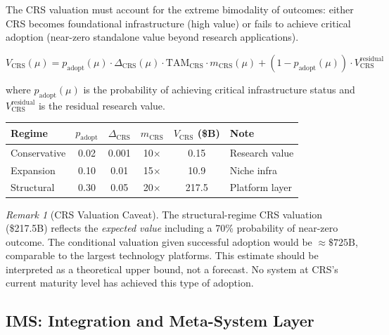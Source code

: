 \documentclass[11pt,a4paper]{article}
\theoremstyle{remark}
\newtheorem{remark}[definition]{Remark}
\newcommand{\VCRS}{V_{\mathrm{CRS}}}
\newcommand{\TAM}{\mathrm{TAM}}
\newcommand{\speculative}[1]{\textcolor{red!70!black}{#1}}
\begin{document}
The CRS valuation must account for the extreme bimodality of outcomes:
either CRS becomes foundational infrastructure (high value) or fails
to achieve critical adoption (near-zero standalone value beyond
research applications).

\begin{equation}
  \VCRS(\mu) = p_{\mathrm{adopt}}(\mu) \cdot
  \Delta_{\mathrm{CRS}}(\mu) \cdot \TAM_{\mathrm{CRS}} \cdot
  m_{\mathrm{CRS}}(\mu)
  + (1 - p_{\mathrm{adopt}}(\mu)) \cdot V_{\mathrm{CRS}}^{\mathrm{residual}}
  \label{eq:vcrs}
\end{equation}

where $p_{\mathrm{adopt}}(\mu)$ is the probability of achieving
critical infrastructure status and
$V_{\mathrm{CRS}}^{\mathrm{residual}}$ is the residual research
value.

\begin{center}
\renewcommand{\arraystretch}{1.2}
\begin{tabular}{lccccl}
\toprule
\textbf{Regime} & $p_{\mathrm{adopt}}$ & $\Delta_{\mathrm{CRS}}$ & $m_{\mathrm{CRS}}$ & $\VCRS$ \textbf{(\$B)} & \textbf{Note} \\
\midrule
Conservative & 0.02 & 0.001 & 10$\times$ & 0.15  & Research value \\
Expansion    & 0.10 & 0.01  & 15$\times$ & 10.9  & Niche infra \\
Structural   & 0.30 & 0.05  & 20$\times$ & 217.5 & Platform layer \\
\bottomrule
\end{tabular}
\end{center}

\begin{remark}[CRS Valuation Caveat]
\label{rem:crs_caveat}
The structural-regime CRS valuation (\$217.5B) reflects the
\emph{expected value} including a 70\% probability of near-zero
outcome.  The conditional valuation given successful adoption would
be $\approx \$725\text{B}$, comparable to the largest technology
platforms.  \speculative{This estimate should be interpreted as a
theoretical upper bound, not a forecast.  No system at CRS's current
maturity level has achieved this type of adoption.}
\end{remark}

\subsection{IMS: Integration and Meta-System Layer}
\label{subsec:ims}
\end{document}
